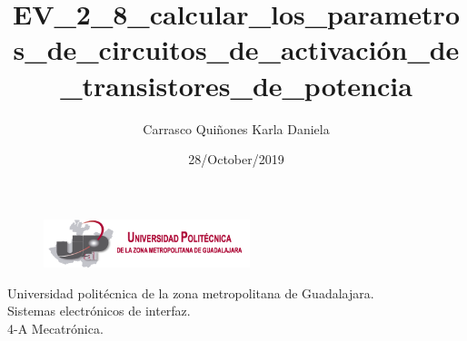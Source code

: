 \documentclass[letterpaper]{article}
\title{EV\_2\_8\_calcular\_los\_parametros\_de\_circuitos\_de\_activación\_de\_transistores\_de\_potencia}
\author{Carrasco Quiñones Karla Daniela}
\date{28/October/2019}
\begin{document}
\begin{figure}[t]
    \includegraphics[width=6cm]{img/logo.png}
\end{figure}
\vspace{2cm}
\maketitle
\vspace{12cm}
\begin{center}
   Universidad politécnica de la zona metropolitana de Guadalajara.\\
Sistemas electrónicos de interfaz.\\
4-A Mecatrónica.\\ 
\end{center}
\newpage
\end{document}
